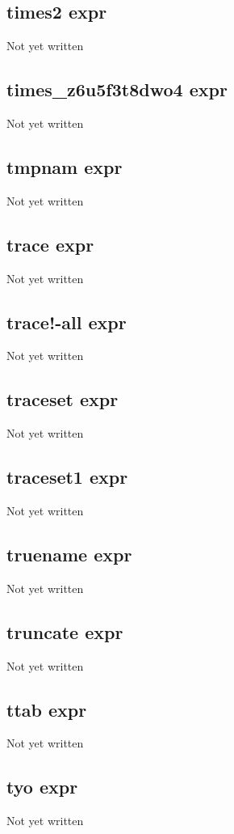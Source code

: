 \documentclass[a4paper,11pt]{article}
\begin{document}
\subsection{\ttfamily times2 expr}
Not yet written

\subsection{\ttfamily times\_z6u5f3t8dwo4 expr}
Not yet written

\subsection{\ttfamily tmpnam expr}
Not yet written

\subsection{\ttfamily trace expr}
Not yet written

\subsection{\ttfamily trace!-all expr}
Not yet written

\subsection{\ttfamily traceset expr}
Not yet written

\subsection{\ttfamily traceset1 expr}
Not yet written

\subsection{\ttfamily truename expr}
Not yet written

\subsection{\ttfamily truncate expr}
Not yet written

\subsection{\ttfamily ttab expr}
Not yet written

\subsection{\ttfamily tyo expr}
Not yet written
\end{document}
